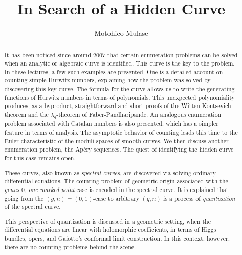 \documentclass{amsart}
\theoremstyle{definition}
\numberwithin{equation}{section}
\numberwithin{figure}{section}
\begin{document}
\large
\setcounter{section}{-1}


\title[In Search of a Hidden Curve]
{In Search of  a Hidden Curve}






\author[M.~Mulase]{Motohico Mulase}
\address{Motohico Mulase:
Department of Mathematics\\
University of California\\
Davis, CA 95616--8633}
\address{and Kavli Institute for the Physics and Mathematics of the Universe (WPI)\\
The University of Tokyo\\
 Kashiwa 277-8583, Japan}





\begin{abstract} 
It has been noticed since around 2007 that certain enumeration problems
can be solved when an analytic or algebraic curve is identified. 
This curve is the key to 
the problem. In these lectures, 
a few such examples are presented. One is a detailed account on counting
simple Hurwitz numbers, explaining
how the problem was solved by discovering this key  curve. The formula for
the curve allows us to write
the generating functions of Hurwitz numbers in terms of
polynomials. This unexpected polynomiality  produces, as a byproduct, 
straightforward and short
proofs of the Witten-Kontsevich theorem and the 
$\lambda_g$-theorem of Faber-Pandharipande. 
An analogous enumeration problem associated with Catalan 
numbers is also presented, which has a simpler feature in terms of analysis. 
The asymptotic behavior of  counting leads this time 
to the Euler characteristic of the moduli spaces of smooth curves.  
We then discuss another enumeration problem,  
the
Ap\'ery sequences. The  quest of
identifying the   hidden  curve for this case   remains open.




These curves, also  known as  \emph{spectral curves},
are discovered  via solving
ordinary differential equations. 
The counting problem of geometric origin associated with the
\emph{genus $0$, one marked point} case is encoded in the spectral curve. 
It is explained that going from the $(g,n)=(0,1)$-case to arbitrary 
$(g,n)$ is a process of \emph{quantization}
of the spectral curve. 


This 
perspective of quantization is   discussed in a geometric setting,
when the differential equations are linear with  holomorphic
coefficients, in terms  of Higgs bundles, opers, and Gaiotto's conformal 
limit construction. In this context, however, there are no counting problems behind the 
scene. 
 \end{abstract}
\end{document}
